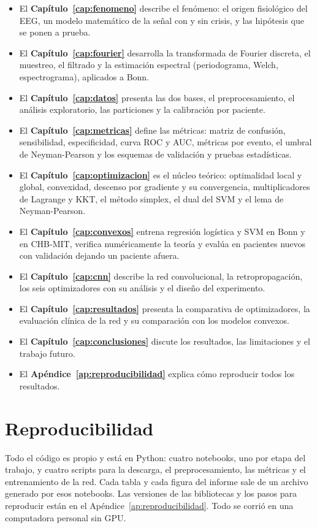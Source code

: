 \begin{itemize}
  \item El \textbf{Capítulo~\ref{cap:fenomeno}} describe el fenómeno: el origen fisiológico del EEG, un modelo matemático de
        la señal con y sin crisis, y las hipótesis que se ponen a prueba.
  \item El \textbf{Capítulo~\ref{cap:fourier}} desarrolla la transformada de Fourier discreta, el muestreo, el filtrado y la
        estimación espectral (periodograma, Welch, espectrograma), aplicados a Bonn.
  \item El \textbf{Capítulo~\ref{cap:datos}} presenta las dos bases, el preprocesamiento, el análisis exploratorio, las
        particiones y la calibración por paciente.
  \item El \textbf{Capítulo~\ref{cap:metricas}} define las métricas: matriz de confusión, sensibilidad, especificidad, curva ROC
        y AUC, métricas por evento, el umbral de Neyman-Pearson y los esquemas de validación y pruebas estadísticas.
  \item El \textbf{Capítulo~\ref{cap:optimizacion}} es el núcleo teórico: optimalidad local y global, convexidad, descenso por
        gradiente y su convergencia, multiplicadores de Lagrange y KKT, el método simplex, el dual del SVM y el lema de
        Neyman-Pearson.
  \item El \textbf{Capítulo~\ref{cap:convexos}} entrena regresión logística y SVM en Bonn y en CHB-MIT, verifica numéricamente la
        teoría y evalúa en pacientes nuevos con validación dejando un paciente afuera.
  \item El \textbf{Capítulo~\ref{cap:cnn}} describe la red convolucional, la retropropagación, los seis optimizadores con su
        análisis y el diseño del experimento.
  \item El \textbf{Capítulo~\ref{cap:resultados}} presenta la comparativa de optimizadores, la evaluación clínica de la red y su
        comparación con los modelos convexos.
  \item El \textbf{Capítulo~\ref{cap:conclusiones}} discute los resultados, las limitaciones y el trabajo futuro.
  \item El \textbf{Apéndice~\ref{ap:reproducibilidad}} explica cómo reproducir todos los resultados.
\end{itemize}

\section{Reproducibilidad}

Todo el código es propio y está en Python: cuatro notebooks, uno por etapa del trabajo, y cuatro scripts para la descarga,
el preprocesamiento, las métricas y el entrenamiento de la red. Cada tabla y cada figura del informe sale de un archivo
generado por esos notebooks. Las versiones de las bibliotecas y los pasos para reproducir están en el
Apéndice~\ref{ap:reproducibilidad}. Todo se corrió en una computadora personal sin GPU.
